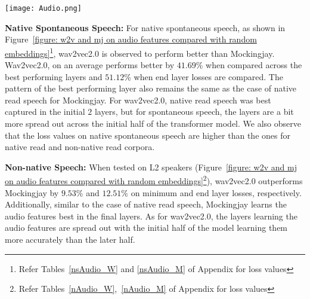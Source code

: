 \documentclass[sigconf]{acmart}
\newcommand{\wv}{wav2vec2.0\xspace}
\newcommand{\mj}{Mockingjay\xspace}
\begin{document}
\begin{figure*}
  \texttt{[image: Audio.png]}
  \caption{Performance of each audio feature (on the y-axis) relative to the performance of random embeddings on the three speech types (native read, native spontaneous, and non native speech). X-axis represent the MSE loss values relative to random embeddings loss \emph{(loss*100/l2\_random\_loss)}.}
  \label{figure: w2v and mj on audio features compared with random embeddings}
\end{figure*}

\textbf{Native Spontaneous Speech:} 
For native spontaneous speech, as shown in Figure~\ref{figure: w2v and mj on audio features compared with random embeddings}\footnote{Refer Tables~\ref{nsAudio_W} and \ref{nsAudio_M} of Appendix for loss values}, \wv is observed to perform better than \mj. Wav2vec2.0, on an average performs better by $41.69\%$ when compared across the best performing layers and $51.12\%$ when end layer losses are compared. The pattern of the best performing layer also remains the same as the case of native read speech for \mj. %
For wav2vec2.0, native read speech was best captured in the initial $2$ layers, but for spontaneous speech, the layers are a bit more spread out across the initial half of the transformer model. We also observe that the loss values on native spontaneous speech are higher than the ones for native read and non-native read corpora.


\textbf{Non-native Speech:} When tested on L2 speakers (Figure~\ref{figure: w2v and mj on audio features compared with random embeddings}\footnote{Refer Tables~\ref{nAudio_W},~\ref{nAudio_M} of Appendix for loss values}), wav2vec2.0 outperforms Mockingjay by $9.53\%$ and $12.51\%$ on minimum and end layer losses, respectively. Additionally, similar to the case of native read speech, Mockingjay learns the audio features best in the final layers. As for wav2vec2.0, the layers learning the audio features are spread out with the initial half of the model learning them more accurately than the later half. 


\end{document}
